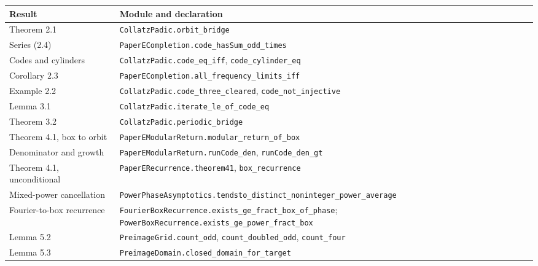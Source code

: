 \documentclass[11pt,a4paper]{article}
\begin{document}
\begin{longtable}[]{@{}
  >{\raggedright\arraybackslash}p{}
  >{\raggedright\arraybackslash}p{}@{}}
\toprule\noalign{}
\begin{minipage}[b]{\linewidth}\raggedright
Result
\end{minipage} & \begin{minipage}[b]{\linewidth}\raggedright
Module and declaration
\end{minipage} \\
\midrule\noalign{}
\endhead
\bottomrule\noalign{}
\endfoot
\bottomrule\noalign{}
\endlastfoot
Theorem 2.1 & \texttt{\nolinkurl{CollatzPadic.orbit_bridge}} \\
Series (2.4) &
\texttt{\nolinkurl{PaperECompletion.code_hasSum_odd_times}} \\
Codes and cylinders & \texttt{\nolinkurl{CollatzPadic.code_eq_iff}},
\texttt{\nolinkurl{code_cylinder_eq}} \\
Corollary 2.3 &
\texttt{\nolinkurl{PaperECompletion.all_frequency_limits_iff}} \\
Example 2.2 & \texttt{\nolinkurl{CollatzPadic.code_three_cleared}},
\texttt{\nolinkurl{code_not_injective}} \\
Lemma 3.1 & \texttt{\nolinkurl{CollatzPadic.iterate_le_of_code_eq}} \\
Theorem 3.2 & \texttt{\nolinkurl{CollatzPadic.periodic_bridge}} \\
Theorem 4.1, box to orbit &
\texttt{\nolinkurl{PaperEModularReturn.modular_return_of_box}} \\
Denominator and growth &
\texttt{\nolinkurl{PaperEModularReturn.runCode_den}},
\texttt{\nolinkurl{runCode_den_gt}} \\
Theorem 4.1, unconditional &
\texttt{\nolinkurl{PaperERecurrence.theorem41}},
\texttt{\nolinkurl{box_recurrence}} \\
Mixed-power cancellation &
\texttt{\nolinkurl{PowerPhaseAsymptotics.tendsto_distinct_noninteger_power_average}} \\
Fourier-to-box recurrence &
\texttt{\nolinkurl{FourierBoxRecurrence.exists_ge_fract_box_of_phase}};
\texttt{\nolinkurl{PowerBoxRecurrence.exists_ge_power_fract_box}} \\
Lemma 5.2 & \texttt{\nolinkurl{PreimageGrid.count_odd}},
\texttt{\nolinkurl{count_doubled_odd}},
\texttt{\nolinkurl{count_four}} \\
Lemma 5.3 &
\texttt{\nolinkurl{PreimageDomain.closed_domain_for_target}} \\

\end{longtable}
\end{document}
